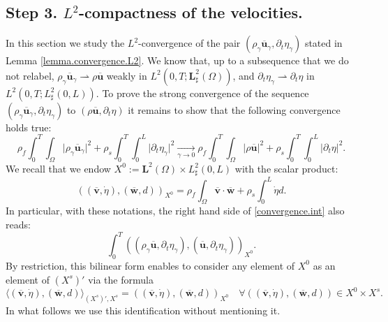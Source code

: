 \documentclass[10pt]{amsart}
\theoremstyle{remark}
\theoremstyle{definition}
\newcommand{\ug}{\boldsymbol{u}}
\newcommand{\vg}{\boldsymbol{v}}
\newcommand{\wg}{\boldsymbol{w}}
\newcommand{\BS}[1]{\boldsymbol{#1}}
\let\CM\Omega
\begin{document}
\subsection{Step 3. $L^2$-compactness of the velocities.}

In this section we study the $L^{2}$\nobreakdash-convergence of the pair $(\rho_{\gamma}\overline{\ug}_{\gamma},\partial_{t}\eta_{\gamma})$ stated in Lemma \ref{lemma.convergence.L2}.
We know that, up to a subsequence that we do not relabel, $\rho_{\gamma}\overline{\ug}_{\gamma}\rightharpoonup\rho\overline{\ug}$ weakly in $L^{2}(0,T;\BS{L}_\sharp^{2}(\CM))$, and $\partial_t\eta_\gamma \rightharpoonup \partial_{t}\eta$ in $L^2(0,T;L^2_{\sharp}(0,L))$. To prove the strong convergence of the sequence $(\rho_{\gamma}\overline{\ug}_{\gamma},\partial_{t}\eta_{\gamma})$ to $(\rho\overline{\ug},\partial_{t}\eta)$ it remains to show that the following convergence holds true:
\begin{equation}\label{convergence.int}
\rho_{f}\int_{0}^{T}\int_{\CM}\vert \rho_{\gamma}\overline{\ug}_{\gamma}\vert^{2}+\rho_{s}\int_{0}^{T}\int_{0}^{L}\vert\partial_{t}\eta_{\gamma}\vert^{2}\underset{\gamma\to 0}{\to}\rho_{f}\int_{0}^{T}\int_{\CM}\vert \rho\overline{\ug}\vert^{2}+\rho_{s}\int_{0}^{T}\int_{0}^{L}\vert\partial_{t}\eta\vert^{2}.
\end{equation}
We recall that we endow $X^0 := \mathbf{L}^2(\Omega) \times L^2_{\sharp}(0,L)$ with the scalar product:
\[
((\overline{\vg},\dot{\eta}), (\overline{\wg},d))_{X^0} = \rho_f \int_{\Omega} \overline{\vg} \cdot \overline{\wg} + \rho_s \int_{0}^L \dot{\eta} d.
\]
In particular, with these notations, the right hand side of \eqref{convergence.int} also reads:
\[
\int_0^T ((\rho_{\gamma}\overline{\ug},\partial_t \eta_{\gamma}), (\overline{\ug},\partial_t \eta_{\gamma}))_{X^0}.
\]
By restriction, this bilinear form enables to consider any element of $X^0$ as an element of $(X^s)'$ via the formula
\begin{equation} \label{eq:embedX0}
\langle (\overline{\vg},\dot{\eta}), (\overline{\wg},d) \rangle_{(X^s)',X^s } = ((\overline{\vg},\dot{\eta}), (\overline{\wg},d))_{X^0}
\quad \forall ((\overline{\vg},\dot{\eta}),(\overline{\wg},d)) \in X^0 \times X^s.
\end{equation}
In what follows we use this identification without mentioning it.
\end{document}
